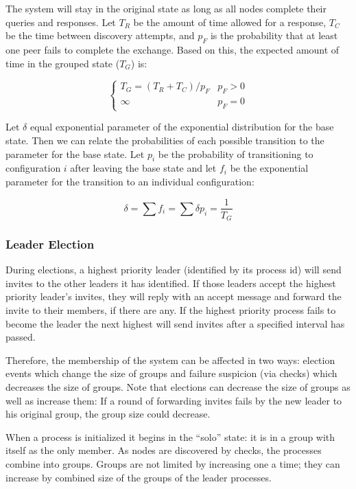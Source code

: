 The system will stay in the original state as long as all nodes complete their queries and responses.
Let $T_{R}$ be the amount of time allowed for a response, $T_{C}$ be the time between
discovery attempts, and $p_{F}$ is the probability that at least one peer fails to complete the exchange.
Based on this, the expected amount of time in the grouped state ($T_{G}$) is:

\begin{equation}
\begin{cases}
T_{G} = ( T_{R}+T_{C}  ) / p_{F} & p_{F} > 0 \\
\infty & p_{F} = 0
\end{cases}
\end{equation}

Let $\delta$ equal exponential parameter of the exponential distribution for the base state. Then
we can relate the probabilities of each possible transition to the parameter for the base state. Let
$p_{i}$ be the probability of transitioning to configuration $i$ after leaving the base state and let
$f_{i}$ be the exponential parameter for the transition to an individual configuration:

\begin{equation}
\delta = \sum f_{i} = \sum \delta p_{i} = \frac{1}{T_{G}}
\end{equation}


\subsubsection{Leader Election}
During elections, a highest priority leader (identified by its process id) will
send invites to the other leaders it has identified. If those leaders accept
the highest priority leader's invites, they will reply with an accept message
and forward the invite to their members, if there are any. If the highest
priority process fails to become the leader the next highest will send invites
after a specified interval has passed.

Therefore, the membership of the system can be affected in two ways: election
events which change the size of groups and failure suspicion (via checks) which
decreases the size of groups. Note that elections can decrease the size of
groups as well as increase them: If a round of forwarding invites fails by the
new leader to his original group, the group size could decrease.

When a process is initialized it begins in the ``solo'' state: it is in a group
with itself as the only member. As nodes are discovered by checks, the
processes combine into groups. Groups are not limited by increasing one a time;
they can increase by combined size of the groups of the leader processes.

